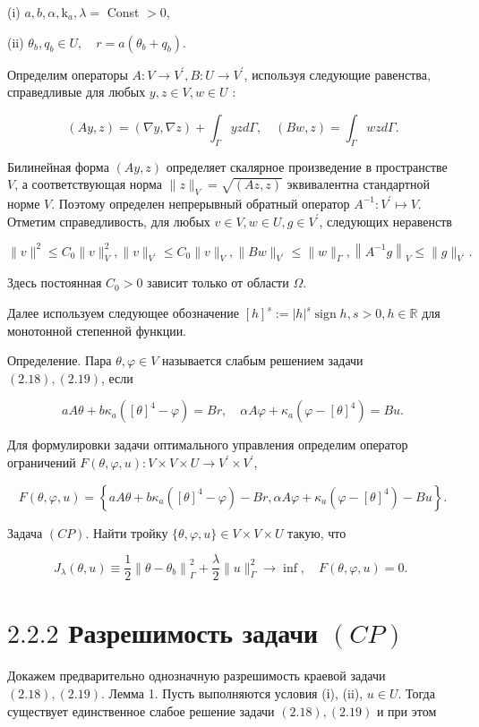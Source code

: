 \documentclass[10pt]{article}
\begin{document}
(i) $a, b, \alpha, \mathrm{k}_{a}, \lambda=$ Const $>0$,

(ii) $\theta_{b}, q_{b} \in U, \quad r=a\left(\theta_{b}+q_{b}\right)$.

Определим операторы $A: V \rightarrow V^{\prime}, B: U \rightarrow V^{\prime}$, используя следующие равенства, справедливые для любых $y, z \in V, w \in U$ :

$$
(A y, z)=(\nabla y, \nabla z)+\int_{\Gamma} y z d \Gamma, \quad(B w, z)=\int_{\Gamma} w z d \Gamma .
$$

Билинейная форма $(A y, z)$ определяет скалярное произведение в пространстве $V$, а соответствующая норма $\|z\|_{V}=\sqrt{(A z, z)}$ эквивалентна стандартной норме $V$. Поэтому определен непрерывный обратный оператор $A^{-1}: V^{\prime} \mapsto V$. Отметим справедливость, для любых $v \in V, w \in U, g \in V^{\prime}$, следующих неравенств

$$
\|v\|^{2} \leqslant C_{0}\|v\|_{V}^{2},\|v\|_{V^{\prime}} \leqslant C_{0}\|v\|_{V},\|B w\|_{V^{\prime}} \leqslant\|w\|_{\Gamma},\left\|A^{-1} g\right\|_{V} \leqslant\|g\|_{V^{\prime}} .
$$

Здесь постоянная $C_{0}>0$ зависит только от области $\Omega$.

Далее используем следующее обозначение $[h]^{s}:=|h|^{s} \operatorname{sign} h, s>0, h \in \mathbb{R}$ для монотонной степенной функции.

Определение. Пара $\theta, \varphi \in V$ называется слабым решением задачи $(2.18),(2.19)$, если

$$
a A \theta+b \kappa_{a}\left([\theta]^{4}-\varphi\right)=B r, \quad \alpha A \varphi+\kappa_{a}\left(\varphi-[\theta]^{4}\right)=B u .
$$

Для формулировки задачи оптимального управления определим оператор ограничений $F(\theta, \varphi, u): V \times V \times U \rightarrow V^{\prime} \times V^{\prime}$,

$$
F(\theta, \varphi, u)=\left\{a A \theta+b \kappa_{a}\left([\theta]^{4}-\varphi\right)-B r, \alpha A \varphi+\kappa_{a}\left(\varphi-[\theta]^{4}\right)-B u\right\} .
$$

Задача $(C P)$. Найти тройку $\{\theta, \varphi, u\} \in V \times V \times U$ такую, что

$$
J_{\lambda}(\theta, u) \equiv \frac{1}{2}\left\|\theta-\theta_{b}\right\|_{\Gamma}^{2}+\frac{\lambda}{2}\|u\|_{\Gamma}^{2} \rightarrow \inf , \quad F(\theta, \varphi, u)=0 \text {. }
$$

\section{$2.2 .2$ Разрешимость задачи $(C P)$}
Докажем предварительно однозначную разрешимость краевой задачи $(2.18),(2.19)$. Лемма 1. Пусть выполняются условия (і), (ii), $u \in U$. Тогда существует единственное слабое решение задачи $(2.18),(2.19)$ и при этом
\end{document}
